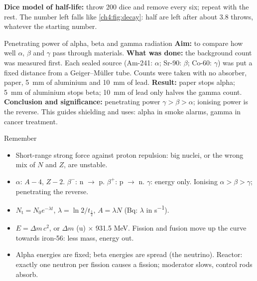 \textbf{Dice model of half-life:} throw 200 dice and remove every six; repeat with the rest.
The number left falls like \cref{ch4:fig:decay}: half are left after about 3.8 throws,
whatever the starting number.

\begin{experiment}{Penetrating power of alpha, beta and gamma radiation}
\textbf{Aim:} to compare how well $\alpha$, $\beta$ and $\gamma$ pass through materials.
\textbf{What was done:} the background count was measured first. Each sealed source (Am-241:
$\alpha$; Sr-90: $\beta$; Co-60: $\gamma$) was put a fixed distance from a Geiger--M\"uller
tube. Counts were taken with no absorber, paper, \qty{5}{mm} of aluminium and \qty{10}{mm} of
lead. \textbf{Result:} paper stops alpha; \qty{5}{mm} of aluminium stops beta; \qty{10}{mm} of
lead only halves the gamma count. \textbf{Conclusion and significance:} penetrating power
$\gamma > \beta > \alpha$; ionising power is the reverse. This guides shielding and uses: alpha
in smoke alarms, gamma in cancer treatment.
\end{experiment}

\begin{summarybox}{Remember}
\begin{itemize}
  \item Short-range strong force against proton repulsion: big nuclei, or the wrong mix of
        $N$ and $Z$, are unstable.
  \item $\alpha$: $A - 4$, $Z - 2$. $\beta^-$: n $\to$ p. $\beta^+$: p $\to$ n. $\gamma$:
        energy only. Ionising $\alpha > \beta > \gamma$; penetrating the reverse.
  \item $N_\mathrm{t} = N_0 e^{-\lambda t}$, $\lambda = \ln 2/t_{\frac{1}{2}}$,
        $A = \lambda N$ (Bq: $\lambda$ in \si{s^{-1}}).
  \item $E = \Delta m\,c^2$, or $\Delta m$ (u) $\times$ 931.5 MeV. Fission and fusion move up
        the curve towards iron-56: less mass, energy out.
  \item Alpha energies are fixed; beta energies are spread (the neutrino). Reactor: exactly one
        neutron per fission causes a fission; moderator slows, control rods absorb.
\end{itemize}
\end{summarybox}
